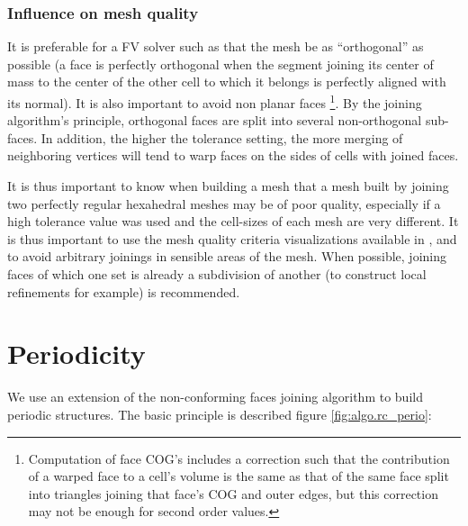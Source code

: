 \subsubsection*{Influence on mesh quality\label{sec:join.quality}}

It is preferable for a FV solver such as \CS that the mesh be as
``orthogonal'' as possible (a face is perfectly orthogonal when the
segment joining its center of mass to the center of the other cell to
which it belongs is perfectly aligned with its normal).
It is also important to avoid non planar faces
\footnote {Computation of face COG's includes a correction such that
the contribution of a warped face to a cell's volume is the same
as that of the same face split into triangles joining that face's
COG and outer edges, but this correction may not be enough
for second order values.}.
By the joining algorithm's principle, orthogonal faces are split
into several non-orthogonal sub-faces. In addition, the higher
the tolerance setting, the more merging of neighboring vertices
will tend to warp faces on the sides of cells with joined faces.

It is thus important to know when building a mesh that a mesh
built by joining two perfectly regular hexahedral meshes may
be of poor quality, especially if a high tolerance value
was used and the cell-sizes of each mesh are very different.
It is thus important to use the mesh quality criteria visualizations
available in \CS, and to avoid arbitrary joinings in sensible
areas of the mesh. When possible, joining faces of which one
set is already a subdivision of another (to construct local
refinements for example) is recommended.

\section*{Periodicity\label{sec:algo.perio}}

We use an extension of the non-conforming faces joining algorithm
to build periodic structures. The basic principle is described
figure \ref{fig:algo.rc_perio}:

